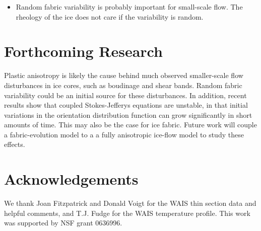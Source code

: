 \documentclass[a0,landscape]{a0poster}
\begin{document}
\begin{multicols}{3}
\begin{itemize}
\item Random fabric variability is probably important for small-scale flow. The rheology of the ice does not care if the variability is random.
\end{itemize}

\color{DarkSlateGray} %


\section*{Forthcoming Research}
Plastic anisotropy is likely the cause behind much observed smaller-scale flow disturbances in ice cores, such as boudinage and shear bands. Random fabric variability could be an initial source for these disturbances. In addition, recent results show that coupled Stokes-Jefferys equations are unstable, in that initial variations in the orientation distribution function can grow significantly in short amounts of time. This may also be the case for ice fabric. Future work will couple a fabric-evolution model to a a fully anisotropic ice-flow model to study these effects.

\nocite{*} %


\section*{Acknowledgements}

We thank Joan Fitzpatrick and Donald Voigt for the WAIS thin section data and helpful comments, and T.J. Fudge for the WAIS temperature profile. This work was supported by NSF grant 0636996.


\end{multicols}
\end{document}
